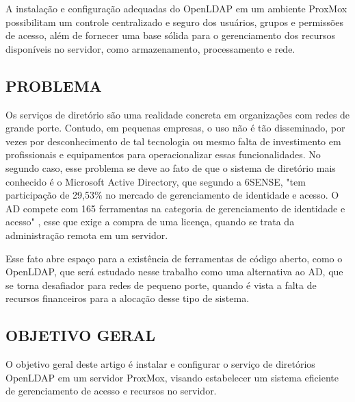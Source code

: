 A instalação e configuração adequadas do OpenLDAP em um ambiente ProxMox possibilitam um controle centralizado e seguro dos usuários, grupos e permissões de acesso, além de fornecer uma base sólida para o gerenciamento dos recursos disponíveis no servidor, como armazenamento, processamento e rede.


\subsection{PROBLEMA}
\label{subsec:problema}
Os serviços de diretório são uma realidade concreta em organizações com redes de grande porte. Contudo, em pequenas empresas, o uso não é tão disseminado, por vezes por desconhecimento de tal tecnologia ou mesmo falta de investimento em profissionais e equipamentos para operacionalizar essas funcionalidades. No segundo caso, esse problema se deve ao fato de que o sistema de diretório mais conhecido é o Microsoft Active Directory, que segundo a 6SENSE, "tem participação de 29,53\% no mercado de gerenciamento de identidade e acesso. O AD compete com 165 ferramentas na categoria de gerenciamento de identidade e acesso" \cite{6sense}, esse que exige a compra de uma licença, quando se trata da administração remota em um servidor.

Esse fato abre espaço para a existência de ferramentas de código aberto, como o OpenLDAP, que será estudado nesse trabalho como uma alternativa ao AD, que se torna desafiador para redes de pequeno porte, quando é vista a falta de recursos financeiros para a alocação desse tipo de sistema.


\subsection{OBJETIVO GERAL}
\label{subsec:objetivo-geral}
O objetivo geral deste artigo é instalar e configurar o serviço de diretórios OpenLDAP em um servidor ProxMox, visando estabelecer um sistema eficiente de gerenciamento de acesso e recursos no servidor.

